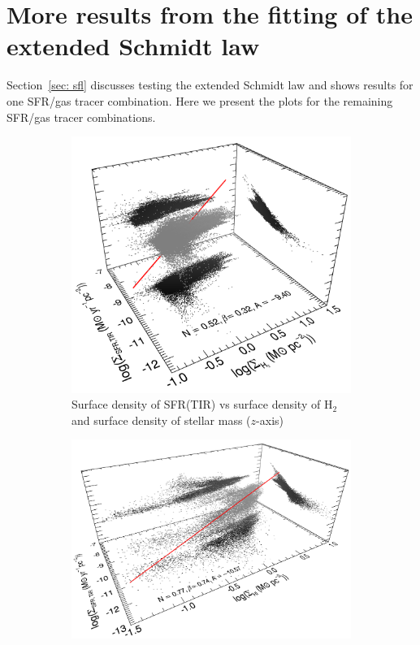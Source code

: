 \newpage
\section{More results from the fitting of the extended Schmidt law}
\label{app:es,figs}
Section~\ref{sec: sfl} discusses testing the extended Schmidt law and shows results for one SFR/gas tracer combination. Here we present the plots for the remaining SFR/gas tracer combinations.


\begin{figure}
    \centering
    \begin{subfigure}[b]{0.5\textwidth}
        \centering
        \includegraphics[width=\textwidth]{../image_paper1/es_tot_fir_vs_h2.png}
        \caption{Surface density of SFR(TIR) vs surface density of H$_2$ and surface density of stellar mass ($z$-axis) }
        \label{fig:es,all,fir,h2}
    \end{subfigure}
    \hfill
    \begin{subfigure}[b]{0.5\textwidth}
        \centering
        \includegraphics[width=\textwidth]{../image_paper1/es_tot_fir_vs_hi2.png}

\end{subfigure}
\end{figure}
